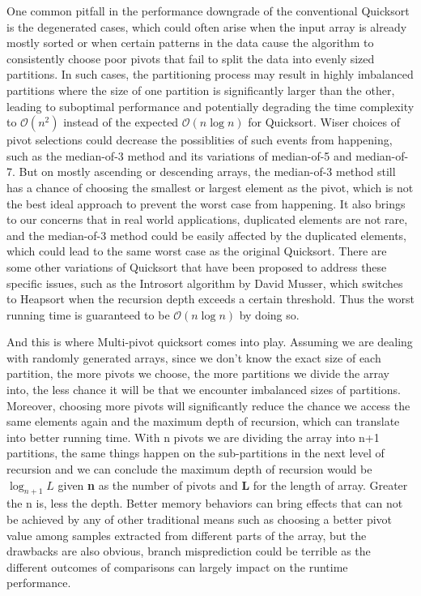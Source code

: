 \documentclass{article}
\newcommand{\bigO}{\mathcal{O}}
\begin{document}
One common pitfall in the performance downgrade of the conventional Quicksort is the degenerated cases,
which could often arise when the input array is already mostly sorted or when certain patterns in the data cause the algorithm to consistently choose poor pivots
that fail to split the data into evenly sized partitions. 
In such cases, the partitioning process may result in highly imbalanced partitions where the size of one partition is significantly larger than the other, leading to suboptimal performance and
potentially degrading the time complexity to $\bigO(n^2)$ instead of the expected $\bigO(n\log n)$ for Quicksort.
Wiser choices of pivot selections could decrease the possiblities of such events from happening, such as the median-of-3 method and its variations of median-of-5 and median-of-7.
But on mostly ascending or descending arrays, the median-of-3 method still has a chance of choosing the smallest or largest element as the pivot,
which is not the best ideal approach to prevent the worst case from happening. It also brings to our concerns that in real world applications, duplicated elements are not rare,
and the median-of-3 method could be easily affected by the duplicated elements, which could lead to the same worst case as the original Quicksort. 
There are some other variations of Quicksort that have been proposed to address these specific issues, such as the Introsort algorithm \cite{Introsort} by David Musser,
which switches to Heapsort when the recursion depth exceeds a certain threshold. Thus the worst running time is guaranteed to be $\bigO(n\log n)$ by doing so.

And this is where Multi-pivot quicksort comes into play. Assuming we are dealing with randomly generated arrays,
since we don't know the exact size of each partition, the more pivots we choose, the more partitions we divide the array into,
the less chance it will be that we encounter imbalanced sizes of partitions. 
Moreover, choosing more pivots will significantly reduce the chance we access the same elements again and the maximum depth of recursion,
which can translate into better running time. With n pivots we are dividing the array into n+1 partitions, the same things happen on the sub-partitions 
in the next level of recursion and we can conclude the maximum depth of recursion would be $\log_{n+1} L$ given \textbf{n} as the number of pivots and \textbf{L} for the length of array.
Greater the n is, less the depth. Better memory behaviors can bring effects that can not be achieved by any of other traditional means such as choosing a better pivot value
among samples extracted from different parts of the array, but the drawbacks are also obvious, 
branch misprediction could be terrible as the different outcomes of comparisons can largely impact on the runtime performance.
\end{document}
